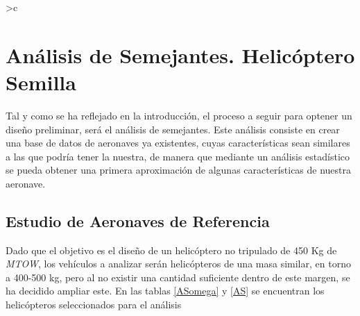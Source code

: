 \thispagestyle{empty}
\newcolumntype{g} {>{}c}
\chapter{Análisis de Semejantes. Helicóptero Semilla}

Tal y como se ha reflejado en la introducción, el proceso a seguir para optener un diseño preliminar, será el análisis de semejantes.
Este análisis consiste en crear una base de datos de aeronaves ya existentes, cuyas características sean similares a las que podría tener la nuestra, de manera que mediante un análisis estadístico se pueda obtener una primera aproximación de algunas características de nuestra aeronave.\\

\section{Estudio de Aeronaves de Referencia}

Dado que el objetivo es el diseño de un helicóptero no tripulado de 450 Kg de \emph{MTOW}, los vehículos a analizar serán helicópteros de una masa similar, en torno a 400-500 kg, pero al no existir una cantidad suficiente dentro de este margen, se ha decidido ampliar este.
En las tablas \ref{ASomega} y \ref{AS} se encuentran los helicópteros seleccionados para el análisis

